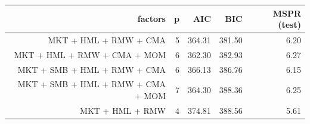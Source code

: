 \begin{tabular}{rrrrr}
\toprule
factors & p & AIC & BIC & MSPR (test) \\
\midrule
MKT + HML + RMW + CMA & 5 & 364.31 & 381.50 & 6.20 \\
MKT + HML + RMW + CMA + MOM & 6 & 362.30 & 382.93 & 6.27 \\
MKT + SMB + HML + RMW + CMA & 6 & 366.13 & 386.76 & 6.15 \\
MKT + SMB + HML + RMW + CMA + MOM & 7 & 364.30 & 388.36 & 6.25 \\
MKT + HML + RMW & 4 & 374.81 & 388.56 & 5.61 \\
\bottomrule
\end{tabular}
